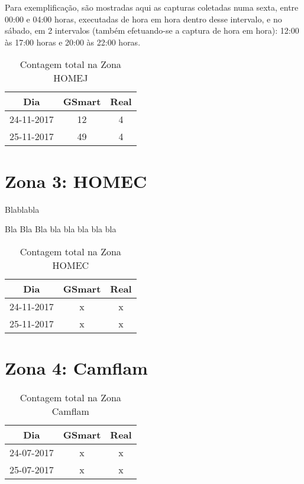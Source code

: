 Para exemplificação, são mostradas aqui as capturas coletadas numa sexta, entre 00:00 e 04:00 horas, executadas de hora em hora dentro desse intervalo, e no sábado, em 2 intervalos (também efetuando-se a captura de hora em hora): 12:00 às 17:00 horas e 20:00 às 22:00 horas.

\begin{table}[h]
\centering
\caption{Contagem total na Zona HOMEJ}
\vspace{0.5cm}
\begin{tabular}{c|cc}
Dia & GSmart & Real \\
\hline                                          
24-11-2017 & 12 & 4 \\
25-11-2017 & 49 & 4 
\end{tabular}
\end{table}


\section{Zona 3: HOMEC}
\label{homec-zone}

Blablabla

Bla Bla Bla bla bla bla bla bla

\begin{table}[h]
\centering
\caption{Contagem total na Zona HOMEC}
\vspace{0.5cm}
\begin{tabular}{c|cc}
Dia & GSmart & Real \\
\hline                                          
24-11-2017 & x & x \\
25-11-2017 & x & x 
\end{tabular}
\end{table}

\section{Zona 4: Camflam}
\label{camflam-zone}

\begin{table}[h]
\centering
\caption{Contagem total na Zona Camflam}
\vspace{0.5cm}
\begin{tabular}{c|cc}

Dia & GSmart & Real \\
\hline                                          
24-07-2017 & x & x \\
25-07-2017 & x & x 

\end{tabular}
\end{table}


